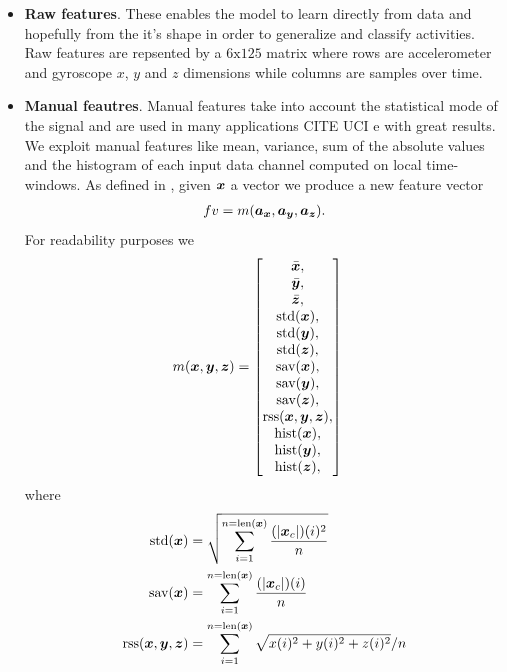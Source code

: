 \begin{itemize}
\item \textbf{Raw features}. These enables the model to
  learn directly from data and hopefully from the it's shape in order
  to generalize and classify activities. Raw features are repsented by
  a $6 \text{x} 125$ matrix where rows are accelerometer and gyroscope
  $x$, $y$ and $z$ dimensions while columns are samples over time.
\item \textbf{Manual feautres}. Manual features take into account the
  statistical mode of the signal and are used in many applications
  CITE UCI e \cite{ignatov2018real} with great results. We exploit
  manual features like mean, variance, sum of the absolute values and
  the histogram of each input data channel computed on local
  time-windows. As defined in \cite{ignatov2018real}, given $\boldsymbol{x}$ a
  vector we produce a new feature vector
  \begin{align}
    fv = m(\boldsymbol{a}_{\boldsymbol{x}}, \boldsymbol{a}_{\boldsymbol{y}}, \boldsymbol{a}_{\boldsymbol{z}}).
  \end{align}
  For readability purposes we  
  \begin{align}
    m(\boldsymbol{x}, \boldsymbol{y}, \boldsymbol{z}) &= \begin{bmatrix}
      \bar{\boldsymbol{x}}, \\
      \bar{\boldsymbol{y}}, \\
      \bar{\boldsymbol{z}}, \\
      \text{std}(\boldsymbol{x}), \\
      \text{std}(\boldsymbol{y}), \\
      \text{std}(\boldsymbol{z}), \\
      \text{sav}(\boldsymbol{x}), \\
      \text{sav}(\boldsymbol{y}), \\
      \text{sav}(\boldsymbol{z}), \\
      \text{rss}(\boldsymbol{x}, \boldsymbol{y}, \boldsymbol{z}), \\
      \text{hist}(\boldsymbol{x}), \\
      \text{hist}(\boldsymbol{y}), \\
      \text{hist}(\boldsymbol{z}), \\
    \end{bmatrix}
  \end{align}
  where
  \begin{align}
    \text{std}(\x) &= \sqrt{ \sum_{i=1}^{n = \text{len}(\x)} \frac{(|\x_c|)(i)^2}{n} } \\
    \text{sav}(\x) &= \sum_{i=1}^{n = \text{len}(\x)} \frac{(|\x_c|)(i)}{n} \\
    \text{rss}(\x, \y, \z) &= \sum_{i=1}^{n =\text{len}(\x)} \sqrt{x(i)^2 + y(i)^2 + z(i)^2} / n \\

\end{align}
\end{itemize}

